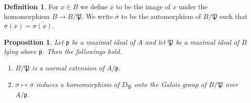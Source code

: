 \documentclass[12pt]{article}
\theoremstyle{plain}
\newtheorem{proposition}[theorem]{Proposition}
\theoremstyle{remark}
\theoremstyle{definition}
\newtheorem{definition}[theorem]{Definition}
\begin{document}
\begin{definition}
    For $x\in B$ we define $\overline{x}$ to be the image of $x$ under the homomorphism $B\to B/\mathfrak{P}$. We write $\overline{\sigma}$ to be the automorphism of $B/\mathfrak{P}$ such that $\overline{\sigma}(\overline{x})=\overline{\sigma(x)}$.
\end{definition}

\begin{proposition}
    Let $\mathfrak{p}$ be a maximal ideal of $A$ and let $\mathfrak{P}$ be a maximal ideal of $B$ lying above $\mathfrak{p}$. Then the followings hold.
    \begin{enumerate}
        \item $B/\mathfrak{P}$ is a normal extension of $A/\mathfrak{p}$.
        \item $\sigma\mapsto\overline{\sigma}$ induces a homomorphism of $D_\mathfrak{P}$ onto the Galois group of $B/\mathfrak{P}$ over $A/\mathfrak{p}$.
    \end{enumerate}
\end{proposition}
\end{document}

